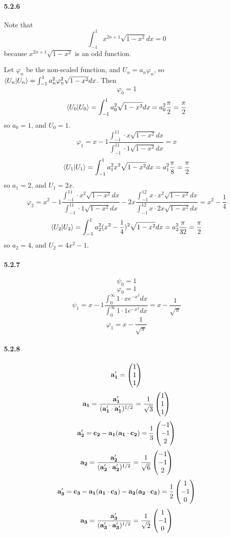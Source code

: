 \documentclass[a4paper]{article}
\begin{document}
\paragraph{5.2.6}
Note that 
\[
\int_{-1}^1x^{2n+1}\sqrt{1-x^2}dx=0
\]
because $x^{2n+1}\sqrt{1-x^2}$ is an odd function.
\medskip

Let $\varphi_n$ be the non-scaled function, and $U_n=a_n\varphi_n$, so $\langle U_n|U_n\rangle=\int_{-1}^1a_n^2\varphi_n^2\sqrt{1-x^2}dx$. Then
\[
\varphi_0=1
\]
\[
\langle U_0|U_0\rangle=\int_{-1}^1a_0^2\sqrt{1-x^2}dx=a_0^2\frac{\pi}{2}=\frac{\pi}{2}
\]
so $a_0=1$, and $U_0=1$.
\[
\varphi_1=x-1\frac{\int_{-1}^11\cdot x\sqrt{1-x^2}dx}{\int_{-1}^11\cdot1\sqrt{1-x^2}dx}=x
\]
\[
\langle U_1|U_1\rangle=\int_{-1}^1a_1^2x^2\sqrt{1-x^2}dx=a_1^2\frac{\pi}{8}=\frac{\pi}{2}
\]
so $a_1=2$, and $U_1=2x$.
\[
\varphi_2=x^2-1\frac{\int_{-1}^11\cdot x^2\sqrt{1-x^2}dx}{\int_{-1}^11\cdot1\sqrt{1-x^2}dx}-2x\frac{\int_{-1}^12x\cdot x^2\sqrt{1-x^2}dx}{\int_{-1}^12x\cdot 2x\sqrt{1-x^2}dx}=x^2-\frac{1}{4}
\]
\[
\langle U_2|U_2\rangle=\int_{-1}^1a_2^2(x^2-\frac{1}{4})^2\sqrt{1-x^2}dx=a_2^2\frac{\pi}{32}=\frac{\pi}{2}
\]
so $a_2=4$, and $U_2=4x^2-1$.

\paragraph{5.2.7}
\[
\psi_0=1
\]
\[
\varphi_0=1
\]
\[
\psi_1=x-1\frac{\int_0^\infty1\cdot xe^{-x^2}dx}{\int_0^\infty1\cdot1e^{-x^2}dx}=x-\frac{1}{\sqrt{\pi}}
\]
\[
\varphi_1=x-\frac{1}{\sqrt{\pi}}
\]

\paragraph{5.2.8}
\[
\mathbf{a_1'}=
\begin{pmatrix}1\\1\\1\end{pmatrix}
\]
\[
\mathbf{a_1}=\frac{\mathbf{a_1'}}{(\mathbf{a_1'}\cdot\mathbf{a_1'})^{1/2}}=\frac{1}{\sqrt{3}}\begin{pmatrix}1\\1\\1\end{pmatrix}
\]
\[
\mathbf{a_2'}=\mathbf{c_2}-\mathbf{a_1}(\mathbf{a_1}\cdot\mathbf{c_2})=\frac{1}{3}\begin{pmatrix}-1\\-1\\2\end{pmatrix}
\]
\[
\mathbf{a_2}=\frac{\mathbf{a_2'}}{(\mathbf{a_2'}\cdot\mathbf{a_2'})^{1/2}}=\frac{1}{\sqrt{6}}\begin{pmatrix}-1\\-1\\2\end{pmatrix}
\]
\[
\mathbf{a_3'}=\mathbf{c_3}-\mathbf{a_1}(\mathbf{a_1}\cdot\mathbf{c_3})-\mathbf{a_2}(\mathbf{a_2}\cdot\mathbf{c_3})=\frac{1}{2}\begin{pmatrix}1\\-1\\0\end{pmatrix}
\]
\[
\mathbf{a_3}=\frac{\mathbf{a_3'}}{(\mathbf{a_3'}\cdot\mathbf{a_3'})^{1/2}}=\frac{1}{\sqrt{2}}\begin{pmatrix}1\\-1\\0\end{pmatrix}
\]
\end{document}
